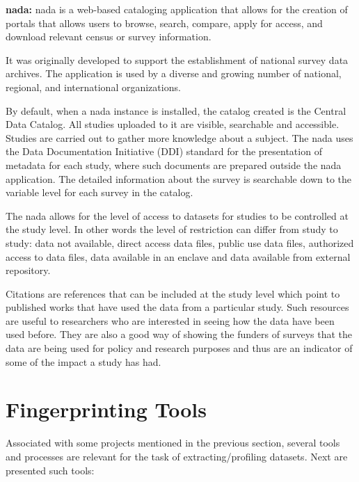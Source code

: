 \textbf{\gls{nada}\cite{data}:}
\gls{nada} is a web-based cataloging application that allows for the creation of portals that allows users to browse, search, compare, apply for access, and download relevant census or survey information.

It was originally developed to support the establishment of national survey data archives.
The application is used by a diverse and growing number of national, regional, and international organizations.

By default, when a \gls{nada} instance is installed, the catalog created is the Central Data Catalog.
All studies uploaded to it are visible, searchable and accessible.
Studies are carried out to gather more knowledge about a subject.
The \gls{nada} uses the Data Documentation Initiative (DDI) standard for the presentation of metadata for each study, where such documents are prepared outside the \gls{nada} application.
The detailed information about the survey is searchable down to the variable level for each survey in the catalog.

The \gls{nada} allows for the level of access to datasets for studies to be controlled at the study level.
In other words the level of restriction can differ from study to study: data not available, direct access data files, public use data files, authorized access to data files, data available in an enclave and data available from external repository.

Citations are references that can be included at the study level which point to published works that have used the data from a particular study.
Such resources are useful to researchers who are interested in seeing how the data have been used before.
They are also a good way of showing the funders of surveys that the data are being used for policy and research purposes and thus are an indicator of some of the impact a study has had.

\section{Fingerprinting Tools}


Associated with some projects mentioned in the previous section, several tools and
processes are relevant for the task of extracting/profiling datasets.
Next are presented such tools:


